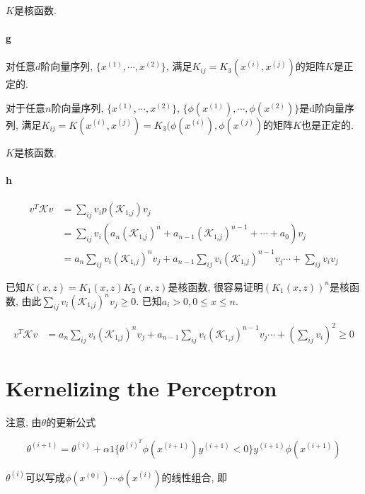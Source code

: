 \documentclass{ctexart}
\begin{document}
$K$是核函数.

\paragraph{g}

对任意$d$阶向量序列, $\{x^{(1)}, \cdots ,x^{(2)}\}$, 满足$K_{ij} = K_3(x^{(i)}, x^{(j)})$的矩阵$K$是正定的. 

对于任意$n$阶向量序列, $\{x^{(1)}, \cdots ,x^{(2)}\}$, $\{ \phi(x^{(1)}), \cdots ,\phi(x^{(2)}) \}$是d阶向量序列, 满足$K_{ij} = K(x^{(i)}, x^{(j)}) = K_3(\phi(x^{(i)}), \phi(x^{(j)})$的矩阵$K$也是正定的.

$K$是核函数.

\paragraph{h}

\begin{align*}
v^T \mathcal{K} v &= \sum_{ij} v_i p(\mathcal{K}_{1_ij})  v_j \\
				&= \sum_{ij} v_i (a_n(\mathcal{K}_{1_ij})^n + a_{n-1}(\mathcal{K}_{1_ij})^{n - 1} + \cdots + a_0)  v_j \\
				&= a_n \sum_{ij} v_i (\mathcal{K}_{1_ij})^n v_j + a_{n-1} \sum_{ij} v_i(\mathcal{K}_{1_ij})^{n - 1} v_j \cdots + \sum_{ij} v_i v_j
\end{align*}

已知$K(x,z) = K_1(x,z)K_2(x,z)$是核函数, 很容易证明$(K_1(x,z))^n$是核函数, 由此$\sum_{ij} v_i (\mathcal{K}_{1_ij})^n v_j \ge 0$. 已知$a_i >0 , 0 \le x \le n$.

\begin{align*}
v^T \mathcal{K} v &= a_n \sum_{ij} v_i (\mathcal{K}_{1_ij})^n v_j + a_{n-1} \sum_{ij} v_i(\mathcal{K}_{1_ij})^{n - 1} v_j \cdots + (\sum_{ij} v_i)^2 \ge 0
\end{align*}

\section{Kernelizing the Perceptron}

注意, 由$\theta$的更新公式

\begin{equation}
\theta^{(i+1)} = \theta^{(i)} + \alpha 1\{\theta^{(i)^T} \phi(x^{(i+1)}) y^{(i+1)} < 0\}  y^{(i+1)}\phi(x^{(i+1)})
\end{equation}

$\theta^{(i)}$可以写成$\phi(x^{(0)}) \cdots \phi(x^{(i)})$的线性组合, 即
\end{document}
